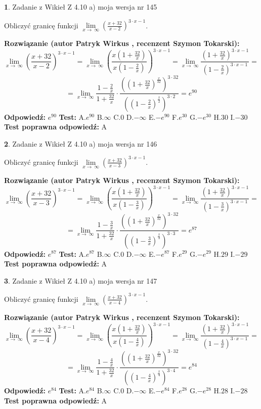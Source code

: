 \documentclass[12pt, a4paper]{article}
\theoremstyle{definition} %
\newtheorem{zad}{}
\newcommand{\zadStart}[1]{\begin{zad}#1\newline}
\newcommand{\zadStop}{\end{zad}}
\newcommand{\rozwStart}[2]{\noindent \textbf{Rozwiązanie (autor #1 , recenzent #2): }\newline}
\newcommand{\rozwStop}{\newline}
\newcommand{\odpStart}{\noindent \textbf{Odpowiedź:}\newline}
\newcommand{\odpStop}{\newline}
\newcommand{\testStart}{\noindent \textbf{Test:}\newline}
\newcommand{\testStop}{\newline}
\newcommand{\kluczStart}{\noindent \textbf{Test poprawna odpowiedź:}\newline}
\newcommand{\kluczStop}{\newline}
\begin{document}
\zadStart{Zadanie z Wikieł Z 4.10 a) moja wersja nr 145}

Obliczyć granicę funkcji  $\lim\limits_{x\to\ \infty}(\frac{x+32}{x-2})^{3\cdot x-1}$.
\zadStop
\rozwStart{Patryk Wirkus}{Szymon Tokarski}
$$\lim\limits_{x\to\ \infty}(\frac{x+32}{x-2})^{3\cdot x-1} = \lim\limits_{x\to\ \infty}(\frac{x(1+\frac{32}{x})}{x(1-\frac{2}{x})})^{3\cdot x-1}=\lim\limits_{x\to\ \infty}\frac{(1+\frac{32}{x})^{3\cdot x-1}}{(1-\frac{2}{x})^{3\cdot x-1}}=$$
$$=\lim\limits_{x\to\ \infty}\frac{1-\frac{2}{x}}{1+\frac{32}{x}}\cdot\frac{((1+\frac{32}{x})^{\frac{x}{32}})^{3\cdot32}}{((1-\frac{2}{x})^{\frac{x}{2}})^{3\cdot2}}=e^{90}$$
\rozwStop
\odpStart
$e^{90}$
\odpStop
\testStart
A.$e^{90}$ B.$\infty$ C.$0$ D.$-\infty$ E.$-e^{90}$
F.$e^{30}$ G.$-e^{30}$
H.$30$
I.$-30$
\testStop
\kluczStart
A
\kluczStop



\zadStart{Zadanie z Wikieł Z 4.10 a) moja wersja nr 146}

Obliczyć granicę funkcji  $\lim\limits_{x\to\ \infty}(\frac{x+32}{x-3})^{3\cdot x-1}$.
\zadStop
\rozwStart{Patryk Wirkus}{Szymon Tokarski}
$$\lim\limits_{x\to\ \infty}(\frac{x+32}{x-3})^{3\cdot x-1} = \lim\limits_{x\to\ \infty}(\frac{x(1+\frac{32}{x})}{x(1-\frac{3}{x})})^{3\cdot x-1}=\lim\limits_{x\to\ \infty}\frac{(1+\frac{32}{x})^{3\cdot x-1}}{(1-\frac{3}{x})^{3\cdot x-1}}=$$
$$=\lim\limits_{x\to\ \infty}\frac{1-\frac{3}{x}}{1+\frac{32}{x}}\cdot\frac{((1+\frac{32}{x})^{\frac{x}{32}})^{3\cdot32}}{((1-\frac{3}{x})^{\frac{x}{3}})^{3\cdot3}}=e^{87}$$
\rozwStop
\odpStart
$e^{87}$
\odpStop
\testStart
A.$e^{87}$ B.$\infty$ C.$0$ D.$-\infty$ E.$-e^{87}$
F.$e^{29}$ G.$-e^{29}$
H.$29$
I.$-29$
\testStop
\kluczStart
A
\kluczStop



\zadStart{Zadanie z Wikieł Z 4.10 a) moja wersja nr 147}

Obliczyć granicę funkcji  $\lim\limits_{x\to\ \infty}(\frac{x+32}{x-4})^{3\cdot x-1}$.
\zadStop
\rozwStart{Patryk Wirkus}{Szymon Tokarski}
$$\lim\limits_{x\to\ \infty}(\frac{x+32}{x-4})^{3\cdot x-1} = \lim\limits_{x\to\ \infty}(\frac{x(1+\frac{32}{x})}{x(1-\frac{4}{x})})^{3\cdot x-1}=\lim\limits_{x\to\ \infty}\frac{(1+\frac{32}{x})^{3\cdot x-1}}{(1-\frac{4}{x})^{3\cdot x-1}}=$$
$$=\lim\limits_{x\to\ \infty}\frac{1-\frac{4}{x}}{1+\frac{32}{x}}\cdot\frac{((1+\frac{32}{x})^{\frac{x}{32}})^{3\cdot32}}{((1-\frac{4}{x})^{\frac{x}{4}})^{3\cdot4}}=e^{84}$$
\rozwStop
\odpStart
$e^{84}$
\odpStop
\testStart
A.$e^{84}$ B.$\infty$ C.$0$ D.$-\infty$ E.$-e^{84}$
F.$e^{28}$ G.$-e^{28}$
H.$28$
I.$-28$
\testStop
\kluczStart
A
\kluczStop
\end{document}

